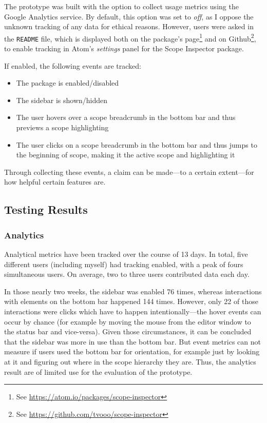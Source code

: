 The prototype was built with the option to collect usage metrics using
the Google Analytics service. By default, this option was set to
\emph{off}, as I oppose the unknown tracking of any data for ethical
reasons. However, users were asked in the \texttt{README} file, which is
displayed both on the package’s
page\footnote{See \url{https://atom.io/packages/scope-inspector}} and on
Github\footnote{See \url{https://github.com/tvooo/scope-inspector}}, to
enable tracking in Atom’s \emph{settings} panel for the Scope Inspector
package.

If enabled, the following events are tracked:

\begin{itemize}
\itemsep1pt\parskip0pt
\item
  The package is enabled/disabled
\item
  The sidebar is shown/hidden
\item
  The user hovers over a scope breadcrumb in the bottom bar and thus
  previews a scope highlighting
\item
  The user clicks on a scope breadcrumb in the bottom bar and thus jumps
  to the beginning of scope, making it the active scope and highlighting
  it
\end{itemize}

Through collecting these events, a claim can be made—to a certain
extent—for how helpful certain features are.

\subsection{Testing Results}\label{testing-results}

\subsubsection{Analytics}\label{analytics}

Analytical metrics have been tracked over the course of 13 days. In
total, five different users (including myself) had tracking enabled,
with a peak of fours simultaneous users. On average, two to three users
contributed data each day.

In those nearly two weeks, the sidebar was enabled 76 times, whereas
interactions with elements on the bottom bar happened 144 times.
However, only 22 of those interactions were clicks which have to happen
intentionally—the hover events can occur by chance (for example by
moving the mouse from the editor window to the status bar and
vice-versa). Given those circumstances, it can be concluded that the
sidebar was more in use than the bottom bar. But event metrics can not
measure if users used the bottom bar for orientation, for example just
by looking at it and figuring out where in the scope hierarchy they are.
Thus, the analytics result are of limited use for the evaluation of the
prototype.

